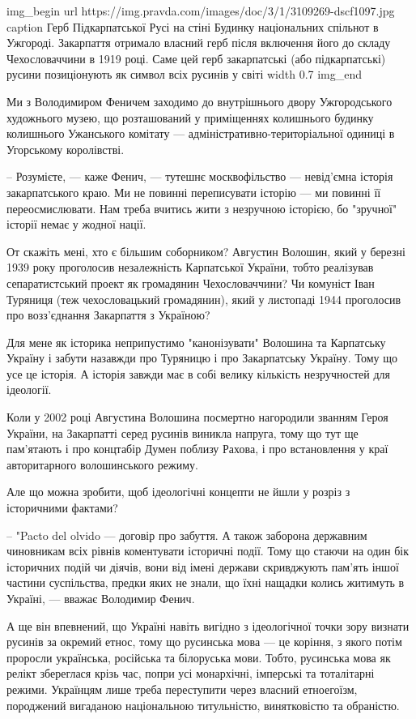 \ifcmt
img_begin 
        url https://img.pravda.com/images/doc/3/1/3109269-dscf1097.jpg
        caption Герб Підкарпатської Русі на стіні Будинку національних спільнот в Ужгороді. Закарпаття отримало власний герб після включення його до складу Чехословаччини в 1919 році. Саме цей герб закарпатські (або підкарпатські) русини позиціонують як символ всіх русинів у світі
        width 0.7
img_end
\fi

Ми з Володимиром Феничем заходимо до внутрішнього двору Ужгородського
художнього музею, що розташований у приміщеннях колишнього будинку колишнього
Ужанського комітату --- адміністративно-територіальної одиниці в Угорському
королівстві.

– Розумієте, --- каже Фенич, --- тутешнє москвофільство --- невід’ємна історія
закарпатського краю. Ми не повинні переписувати історію --- ми повинні її
переосмислювати. Нам треба вчитись жити з незручною історією, бо "зручної"
історії немає у жодної нації.

От скажіть мені, хто є більшим соборником? Августин Волошин, який у березні
1939 року проголосив незалежність Карпатської України, тобто реалізував
сепаратистський проект як громадянин Чехословаччини? Чи комуніст Іван Туряниця
(теж чехословацький громадянин), який у листопаді 1944 проголосив про
возз’єднання Закарпаття з Україною?

Для мене як історика неприпустимо "канонізувати" Волошина та Карпатську Україну
і забути назавжди про Туряницю і про Закарпатську Україну. Тому що усе це
історія. А історія завжди має в собі велику кількість незручностей для
ідеології.

Коли у 2002 році Августина Волошина посмертно нагородили званням Героя України,
на Закарпатті серед русинів виникла напруга, тому що тут ще пам’ятають і про
концтабір Думен поблизу Рахова, і про встановлення у краї авторитарного
волошинського режиму.

Але що можна зробити, щоб ідеологічні концепти не йшли у розріз з історичними
фактами?

– "Pacto del olvido --- договір про забуття. А також заборона державним
чиновникам всіх рівнів коментувати історичні події. Тому що стаючи на один бік
історичних подій чи діячів, вони від імені держави скривджують пам'ять іншої
частини суспільства, предки яких не знали, що їхні нащадки колись житимуть в
Україні, --- вважає Володимир Фенич.

А ще він впевнений, що Україні навіть вигідно з ідеологічної точки зору визнати
русинів за окремий етнос, тому що русинська мова --- це коріння, з якого потім
проросли українська, російська та білоруська мови. Тобто, русинська мова як
релікт збереглася крізь час, попри усі монархічні, імперські та тоталітарні
режими. Українцям лише треба переступити через власний етноегоїзм, породжений
вигаданою національною титульністю, винятковістю та обраністю.


